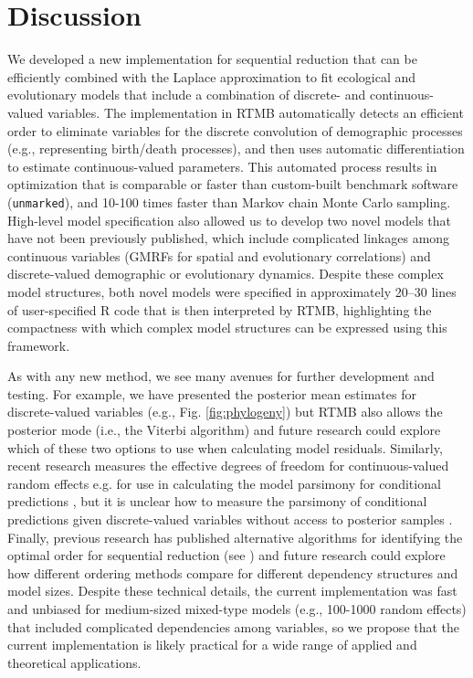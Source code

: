 \documentclass[11pt]{article}
\begin{document}
\section{Discussion}

We developed a new implementation for sequential reduction that can be efficiently combined with the Laplace approximation to fit ecological and evolutionary models that include a combination of discrete- and continuous-valued variables.  The implementation in RTMB automatically detects an efficient order to eliminate variables for the discrete convolution of demographic processes (e.g., representing birth/death processes), and then uses automatic differentiation to estimate continuous-valued parameters.  This automated process results in optimization that is comparable or faster than custom-built benchmark software (\texttt{unmarked}), and 10-100 times faster than Markov chain Monte Carlo sampling. High-level model specification also allowed us to develop two novel models that have not been previously published, which include complicated linkages among continuous variables (GMRFs for spatial and evolutionary correlations) and discrete-valued demographic or evolutionary dynamics. Despite these complex model structures, both novel models were specified in approximately 20–30 lines of user-specified R code that is then interpreted by RTMB, highlighting the compactness with which complex model structures can be expressed using this framework.

As with any new method, we see many avenues for further development and testing.  For example, we have presented the posterior mean estimates for discrete-valued variables (e.g., Fig. \ref{fig:phylogeny}) but RTMB also allows the posterior mode (i.e., the Viterbi algorithm) and future research could explore which of these two options to use when calculating model residuals.  Similarly, recent research measures the effective degrees of freedom for continuous-valued random effects e.g. for use in calculating the model parsimony for conditional predictions \citep{zheng_note_2024}, but it is unclear how to measure the parsimony of conditional predictions given discrete-valued variables without access to posterior samples \citep{watanabe_widely_2013}.  Finally, previous research has published alternative algorithms for identifying the optimal order for sequential reduction (see \citeauthor{hojsgaard_graphical_2012} \citeyear{hojsgaard_graphical_2012}) and future research could explore how different ordering methods compare for different dependency structures and model sizes.  Despite these technical details, the current implementation was fast and unbiased for medium-sized mixed-type models (e.g., 100-1000 random effects) that included complicated dependencies among variables, so we propose that the current implementation is likely practical for a wide range of applied and theoretical applications.  
\end{document}
